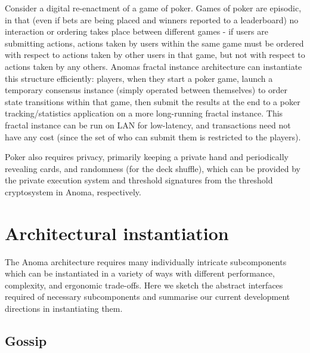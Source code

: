 Consider a digital re-enactment of a game of poker. Games of poker are
episodic, in that (even if bets are being placed and winners reported to
a leaderboard) no interaction or ordering takes place between different
games - if users are submitting actions, actions taken by users within
the same game must be ordered with respect to actions taken by other
users in that game, but not with respect to actions taken by any others.
Anoma\textquotesingle s fractal instance architecture can instantiate
this structure efficiently: players, when they start a poker game,
launch a temporary consensus instance (simply operated between
themselves) to order state transitions within that game, then submit the
results at the end to a poker tracking/statistics application on a more
long-running fractal instance. This fractal instance can be run on LAN
for low-latency, and transactions need not have any cost (since the set
of who can submit them is restricted to the players).

Poker also requires privacy, primarily keeping a private hand and
periodically revealing cards, and randomness (for the deck shuffle),
which can be provided by the private execution system and threshold
signatures from the threshold cryptosystem in Anoma, respectively.

\section{Architectural instantiation}\label{architectural-instantiation}

The Anoma architecture requires many individually intricate
subcomponents which can be instantiated in a variety of ways with
different performance, complexity, and ergonomic trade-offs. Here we
sketch the abstract interfaces required of necessary subcomponents and
summarise our current development directions in instantiating them.

\subsection{Gossip}\label{gossip}

